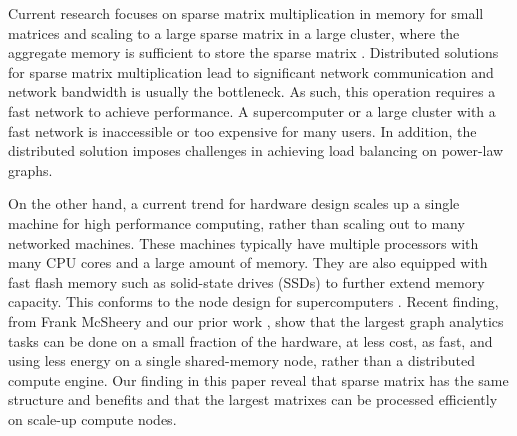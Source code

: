 %




Current research focuses on sparse matrix multiplication in memory
for small matrices and scaling to a large sparse matrix in a large cluster,
where the aggregate memory is sufficient to store the sparse matrix
\cite{Williams07, Yoo11, Boman2013}.
Distributed solutions for sparse matrix multiplication lead to significant
network communication and network bandwidth is usually the bottleneck.
As such, this operation requires a fast network to achieve performance.
A supercomputer or a large cluster with a fast network is inaccessible or
too expensive for many users. In addition, the distributed solution imposes
challenges in achieving load balancing on power-law graphs.

On the other hand, a current trend for hardware design scales up
a single machine for high performance computing, rather than scaling out to 
many networked machines.
These machines typically have multiple processors with many CPU cores and
a large amount of memory. They are also equipped with fast flash
memory such as solid-state drives (SSDs) to further extend memory capacity.
This conforms to the node design for supercomputers \cite{Ang14}.
Recent finding, from Frank McSheery \cite{McSherry15,McSherryBlog} and our
prior work \cite{FlashGraph},
show that the largest graph analytics tasks can be done on a small fraction of
the hardware, at less cost, as fast, and using less energy on a single shared-memory 
node, rather than a distributed compute engine.  Our finding in this paper reveal
that sparse matrix has the same structure and benefits and that the largest 
matrixes can be processed efficiently on scale-up compute nodes.

